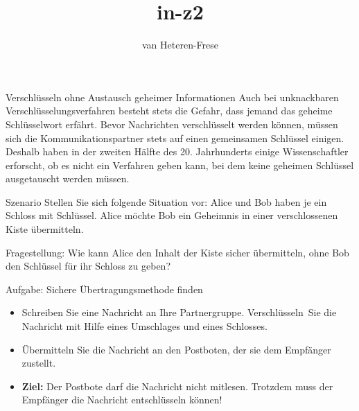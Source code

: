 \documentclass[11pt]{beamer}
\author{van Heteren-Frese}
\title{in-z2}
\subtitle{}
\institute{Schadow Gymnasium}
\begin{document}
\begin{frame}{Verschlüsseln ohne Austausch geheimer Informationen}
Auch bei unknackbaren Verschlüsselungsverfahren besteht stets die Gefahr, dass jemand das geheime Schlüsselwort erfährt. Bevor Nachrichten verschlüsselt werden können, müssen sich die Kommunikationspartner stets auf einen gemeinsamen Schlüssel einigen. Deshalb haben in der zweiten Hälfte des 20. Jahrhunderts einige Wissenschaftler erforscht, ob es nicht ein Verfahren geben kann, bei dem keine geheimen Schlüssel ausgetauscht werden müssen.
\end{frame}
%
\begin{frame}{Szenario}
\small
Stellen Sie sich folgende Situation vor: Alice und Bob haben \alert{je ein Schloss mit Schlüssel}.
Alice möchte Bob ein Geheimnis in einer verschlossenen Kiste übermitteln.
\begin{block}{Fragestellung:}
	Wie kann Alice den Inhalt der Kiste sicher übermitteln, ohne Bob den Schlüssel für ihr Schloss zu geben?
\end{block}
\end{frame}
%
\begin{frame}{Aufgabe: Sichere Übertragungsmethode finden}
\begin{itemize}
\item Schreiben Sie eine Nachricht an Ihre Partnergruppe. \glqq Verschlüsseln\grqq\  Sie die Nachricht mit Hilfe eines Umschlages und eines Schlosses.
\item Übermitteln Sie die Nachricht an den Postboten, der sie dem Empfänger zustellt.
\item \textbf{Ziel:} Der Postbote darf die Nachricht nicht mitlesen. Trotzdem muss der Empfänger die Nachricht entschlüsseln können!
\end{itemize}
\end{frame}
\end{document}
